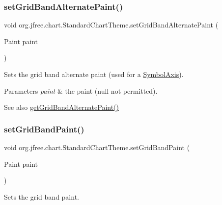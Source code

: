 \subsubsection{\texorpdfstring{set\+Grid\+Band\+Alternate\+Paint()}{setGridBandAlternatePaint()}}
{\footnotesize\ttfamily void org.\+jfree.\+chart.\+Standard\+Chart\+Theme.\+set\+Grid\+Band\+Alternate\+Paint (\begin{DoxyParamCaption}\item[{Paint}]{paint }\end{DoxyParamCaption})}

Sets the grid band alternate paint (used for a \mbox{\hyperlink{}{Symbol\+Axis}}).


\begin{DoxyParams}{Parameters}
{\em paint} & the paint ({\ttfamily null} not permitted).\\
\hline
\end{DoxyParams}
\begin{DoxySeeAlso}{See also}
\mbox{\hyperlink{classorg_1_1jfree_1_1chart_1_1_standard_chart_theme_a71a0211f432b4f5c545cdb4850492730}{get\+Grid\+Band\+Alternate\+Paint()}} 
\end{DoxySeeAlso}
\mbox{\label{classorg_1_1jfree_1_1chart_1_1_standard_chart_theme_a6c4f54c13a6b54deeaca77e4b13e35fd}} 
\subsubsection{\texorpdfstring{set\+Grid\+Band\+Paint()}{setGridBandPaint()}}
{\footnotesize\ttfamily void org.\+jfree.\+chart.\+Standard\+Chart\+Theme.\+set\+Grid\+Band\+Paint (\begin{DoxyParamCaption}\item[{Paint}]{paint }\end{DoxyParamCaption})}

Sets the grid band paint.



